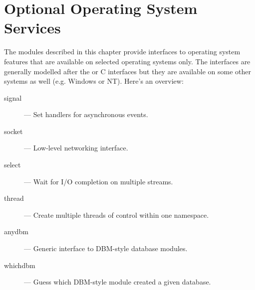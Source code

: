 \chapter{Optional Operating System Services}

The modules described in this chapter provide interfaces to operating
system features that are available on selected operating systems only.
The interfaces are generally modelled after the \UNIX{} or C
interfaces but they are available on some other systems as well
(e.g. Windows or NT).  Here's an overview:

\begin{description}

\item[signal]
--- Set handlers for asynchronous events.

\item[socket]
--- Low-level networking interface.

\item[select]
--- Wait for I/O completion on multiple streams.

\item[thread]
--- Create multiple threads of control within one namespace.

\item[anydbm]
--- Generic interface to DBM-style database modules.
\item[whichdbm]
--- Guess which DBM-style module created a given database.

\end{description}
